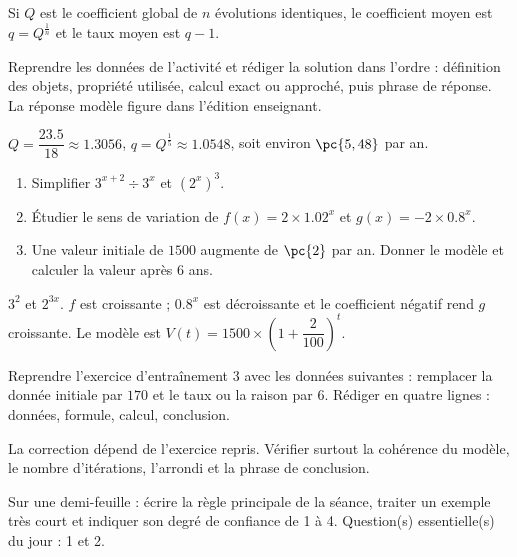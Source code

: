 \begin{summary}Si $Q$ est le coefficient global de $n$ évolutions identiques, le coefficient moyen est $q=Q^{\frac1n}$ et le taux moyen est $q-1$.\end{summary}

\begin{example}
Reprendre les données de l'activité et rédiger la solution dans l'ordre : définition des objets, propriété utilisée, calcul exact ou approché, puis phrase de réponse. La réponse modèle figure dans l'édition enseignant.
\end{example}
\begin{solution}$Q=\dfrac{\num{23,5}}{18}\approx\num{1,3056}$, $q=Q^{\frac15}\approx\num{1,0548}$, soit environ $\pc{5,48}$ par an.\end{solution}

\begin{exercise}[essentiel]
\begin{enumerate}\item Simplifier $3^{x+2}\div3^x$ et $(2^x)^3$.\item Étudier le sens de variation de $f(x)=2\times\num{1,02}^x$ et $g(x)=-2\times\num{0,8}^x$.\item Une valeur initiale de $1500$ augmente de $\pc{2}$ par an. Donner le modèle et calculer la valeur après $6$ ans.\end{enumerate}
\end{exercise}
\begin{solution}$3^2$ et $2^{3x}$. $f$ est croissante ; $\num{0,8}^x$ est décroissante et le coefficient négatif rend $g$ croissante. Le modèle est $V(t)=1500\times\left(1+\dfrac{2}{100}\right)^t$.\end{solution}


\begin{homework}Reprendre l'exercice d'entraînement 3 avec les données suivantes : remplacer la donnée initiale par $170$ et le taux ou la raison par $6$. Rédiger en quatre lignes : données, formule, calcul, conclusion.\end{homework}
\begin{solution}La correction dépend de l'exercice repris. Vérifier surtout la cohérence du modèle, le nombre d'itérations, l'arrondi et la phrase de conclusion.\end{solution}

\begin{exitticket}[3 minutes]Sur une demi-feuille : écrire la règle principale de la séance, traiter un exemple très court et indiquer son degré de confiance de 1 à 4. Question(s) essentielle(s) du jour : 1 et 2.\end{exitticket}

